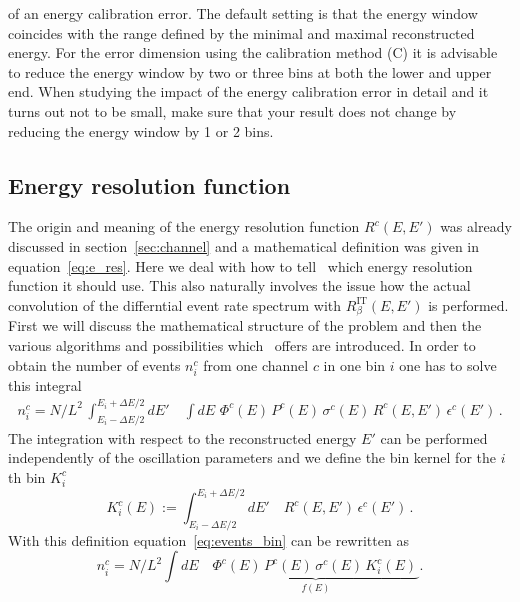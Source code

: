 of an energy calibration error. The default setting is that the energy window
coincides with the range defined by the minimal and maximal reconstructed 
energy. For the error dimension using the calibration method (C) it is 
advisable to reduce the energy window by two or three bins at both the lower
and upper end. When studying the impact of the energy calibration
error in detail and it turns out not to be small, make sure that your result
does not change by reducing the energy window by 1 or 2 bins.


\subsection{Energy resolution function}
\label{sec:energy}

The origin and meaning of the energy resolution function 
$R^c(E,E')$ was already discussed in 
section~\ref{sec:channel} and  a mathematical definition
was given in equation~\ref{eq:e_res}. Here we deal with
how to tell \GLOBES\ which energy resolution function it should
use. This also naturally involves the issue how the actual convolution
of the differntial event rate spectrum with $R_\beta^{\text{IT}}(E,E')$
is performed. First we will discuss the mathematical structure of
the problem and then the various algorithms and possibilities which
\GLOBES\ offers are introduced. In order to obtain the number of events 
$n_i^c$ from one channel $c$ in one bin $i$ one has to solve this integral
%
\begin{eqnarray}
\label{eq:events_bin}
n_i^c=N/L^2\,\int_{E_i-\Delta E/2}^{E_i+\Delta E/2} dE' 
\quad \int dE \,\, \Phi^c(E)\,
P^c(E)\,
\sigma^c(E)\,
R^c(E,E')\,
\epsilon^c(E')\,.
\end{eqnarray} 
%
The integration with respect to the reconstructed energy $E'$ can be
performed independently of the oscillation parameters and we define
the bin kernel for the $i$th bin $K_i^c$
\begin{equation}
\label{eq:kernel}
K_i^c(E):=\int_{E_i-\Delta E/2}^{E_i+\Delta E/2} dE' 
\quad R^c(E,E')\,
\epsilon^c(E')\,.
\end{equation}
With this definition equation~\ref{eq:events_bin} can be rewritten as
\begin{equation}
\label{eq:simple_int}
n_i^c=N/L^2 \int dE\quad  \underbrace{\Phi^c(E)\,
P^c(E)\,
\sigma^c(E)\,
K_i^c(E)\,}_{f(E)}. 
\end{equation}

